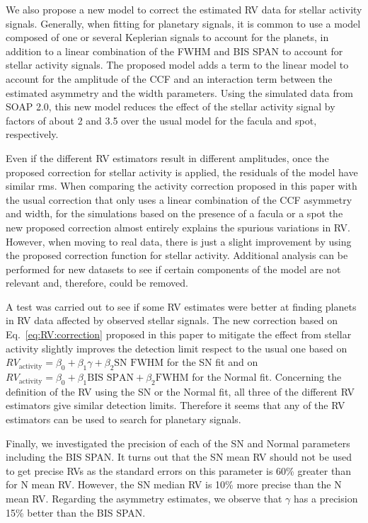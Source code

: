 \documentclass{aa}
\begin{document}
We also propose a new model to correct the estimated RV data for stellar activity signals. 
Generally, when fitting for planetary signals, it is common to use a model composed of one or several Keplerian signals to account for the planets, in addition to a linear combination of the FWHM and BIS SPAN to account for stellar activity signals. 
The proposed model adds a term to the linear model to account for the amplitude of the CCF and an interaction term between the estimated asymmetry and the width parameters. 
Using the simulated data from SOAP 2.0, this new model reduces the effect of the stellar activity signal by factors of about 2 and 3.5 over the usual model for the facula and spot, respectively.



Even if the different RV estimators result in different amplitudes, once the proposed correction for stellar activity is applied, the residuals of the model have similar rms.
When comparing the activity correction proposed in this paper with the usual correction that only uses a linear combination of the CCF asymmetry and width, for the simulations based on the presence of a facula or a spot the new proposed correction almost entirely explains the spurious variations in RV. However, when moving to real data, there is just a slight improvement by using the proposed correction function for stellar activity. 
Additional analysis can be performed for new datasets to see if certain components of the model are not relevant and, therefore, could be removed.

A test was carried out to see if some RV estimates were better at finding planets in RV data affected by observed stellar signals. The new correction based on Eq.~\eqref{eq:RV:correction} proposed in this paper to mitigate the effect from stellar activity slightly improves the detection limit respect to the usual one based on $RV_{\text{activity}}=\beta_0+\beta_1 \gamma + \beta_2 \text{SN FWHM}$ for the SN fit and on $RV_{\text{activity}}=\beta_0+\beta_1 \text{BIS SPAN} + \beta_2 \text{FWHM}$ for the Normal fit.
Concerning the definition of the RV using the SN or the Normal fit, all three of the different RV estimators give similar detection limits. Therefore it seems that any of the RV estimators can be used to search for planetary signals.

Finally, we investigated the precision of each of the SN and Normal parameters including the BIS SPAN. It turns out that the SN mean RV should not be used to get precise RVs as the standard errors on this parameter is 60\% greater than for N mean RV. 
However, the SN median RV is 10\% more precise than the N mean RV. 
Regarding the asymmetry estimates, we observe that $\gamma$ has a precision 15\% better than the BIS SPAN.
\end{document}
